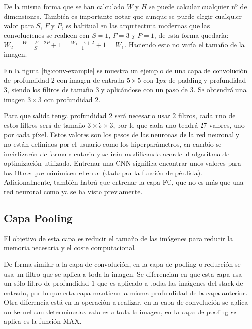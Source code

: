 De la misma forma que se han calculado $W$ y $H$ se puede calcular cualquier nº de dimensiones. También es importante notar que aunque se puede elegir cualquier valor para $S$, $F$ y $P$, es habitual en las arquitectura modernas que las convoluciones se realicen con $S=1$, $F=3$ y $P=1$, de esta forma quedaría: $W_2 = \frac{W_1-F+2P}{S} + 1 = \frac{W_1 - 3 + 2}{1} + 1 = W_1$. Haciendo esto no varía el tamaño de la imagen.

En la figura \ref{fig:conv-example}\cite{Li2020} se muestra un ejemplo de una capa de convolución de profundidad $2$ con imagen de entrada $5 \times 5$ con $1 px$ de padding y profundidad $3$, siendo los filtros de tamaño $3$ y aplicándose con un paso de $3$. Se obtendrá una imagen $3\times 3$ con profundidad $2$.

Para que salida tenga profundidad $2$ será necesario usar $2$ filtros, cada uno de estos filtros será de tamaño $3\times 3 \times 3$, por lo que cada uno tendrá 27 valores, uno por cada píxel. Estos valores son los pesos de las neuronas de la red neuronal y no están definidos por el usuario como los hiperparámetros, en cambio se incializarán de forma aleatoria y se irán modificando acorde al algoritmo de optimización utilizado. Entrenar una CNN significa encontrar unos valores para los filtros que minimicen el error (dado por la función de pérdida). Adicionalmente, también habrá que entrenar la capa FC, que no es más que una red neuronal como ya se ha visto previamente.


\subsection{Capa Pooling}

El objetivo de esta capa es reducir el tamaño de las imágenes para reducir la memoria necesaria y el coste computacional.

De forma similar a la capa de convolución, en la capa de pooling o reducción se usa un filtro que se aplica a toda la imagen. Se diferencian en que esta capa usa un sólo filtro de profundidad $1$ que es aplicado a todas las imágenes del stack de entrada, por lo que esta capa mantiene la misma profundidad de la capa anterior. Otra diferencia está en la operación a realizar, en la capa de convolución se aplica un kernel con determinados valores a toda la imagen, en la capa de pooling se aplica es la función MAX.

